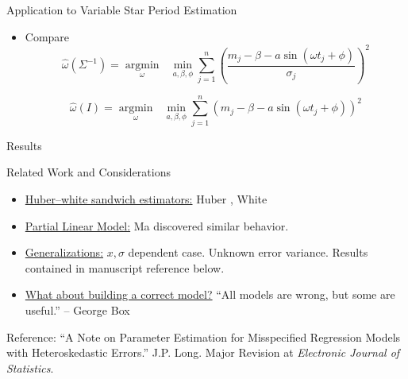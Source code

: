 \documentclass[12pt]{beamer}
\newcommand{\argmin}[1]{\underset{#1}{\operatorname{argmin}}\text{ }}
\begin{document}
\begin{frame}{Application to Variable Star Period Estimation}
\begin{itemize}


  
\item Compare
  \begin{equation*}
    \widehat{\omega}(\Sigma^{-1}) = \argmin{\omega} \min_{a,\beta,\phi} \sum_{j=1}^{n} \left(\frac{m_{j} - \beta - a\sin(\omega t_{j} + \phi)}{\sigma_{j}}\right)^2
  \end{equation*}

  \begin{equation*}
    \widehat{\omega}(I) = \argmin{\omega} \min_{a,\beta,\phi} \sum_{j=1}^{n} \left(m_{j} - \beta - a\sin(\omega t_{j} + \phi)\right)^2
  \end{equation*}

  
  
  
\end{itemize}
\end{frame}


\begin{frame}{Results}


\end{frame}


\begin{frame}{Related Work and Considerations}

\begin{itemize}
\item \underline{Huber--white sandwich estimators:} Huber \cite{huber1967behavior}, White \cite{white1980using,white1981consequences}
\item \underline{Partial Linear Model:} Ma \cite{ma2006efficient,ma2013doubly} discovered similar behavior.
\item \underline{Generalizations:} $x, \sigma$ dependent case. Unknown error variance. Results contained in manuscript reference below.
\item \underline{What about building a correct model?} ``All models are wrong, but some are useful.'' -- George Box
\end{itemize}

\vspace{.3in}

\footnotesize{Reference: ``A Note on Parameter Estimation for Misspecified Regression Models with Heteroskedastic Errors.'' J.P. Long. Major Revision at \textit{Electronic Journal of Statistics}.}
\end{frame}
\end{document}
